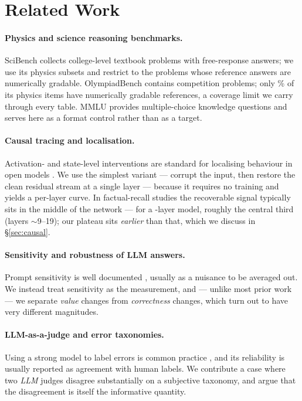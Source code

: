 \documentclass[10pt,letterpaper]{article}
\begin{document}
\section{Related Work}
\label{sec:related}

\paragraph{Physics and science reasoning benchmarks.}
SciBench \citep{wang2023scibench} collects college-level textbook problems with
free-response answers; we use its physics subsets and restrict to the
\nbSciBench{} problems whose reference answers are numerically gradable.
OlympiadBench \citep{he2024olympiadbench} contains competition problems; only
\pctOlympiadScorable\% of its physics items have numerically gradable references,
a coverage limit we carry through every table. MMLU \citep{hendrycks2021mmlu}
provides multiple-choice knowledge questions and serves here as a format control
rather than as a target.

\paragraph{Causal tracing and localisation.}
Activation- and state-level interventions are standard for localising behaviour
in open models \citep{meng2022locating,stolfo2023mechanistic}. We use the simplest
variant --- corrupt the input, then restore the clean residual stream at a single
layer --- because it requires no training and yields a per-layer curve. In
factual-recall studies the recoverable signal typically sits in the middle of the
network --- for a \nbLayers-layer model, roughly the central third (layers
$\sim$9--19); our plateau sits \emph{earlier} than that, which we discuss in
\S\ref{sec:causal}.

\paragraph{Sensitivity and robustness of LLM answers.}
Prompt sensitivity is well documented \citep{sclar2023quantifying}, usually as a
nuisance to be averaged out. We instead treat sensitivity as the measurement, and
--- unlike most prior work --- we separate \emph{value} changes from
\emph{correctness} changes, which turn out to have very different magnitudes.

\paragraph{LLM-as-a-judge and error taxonomies.}
Using a strong model to label errors is common practice
\citep{zheng2023judging}, and its reliability is usually reported as agreement
with human labels. We contribute a case where two \emph{LLM} judges disagree
substantially on a subjective taxonomy, and argue that the disagreement is itself
the informative quantity.
\end{document}
